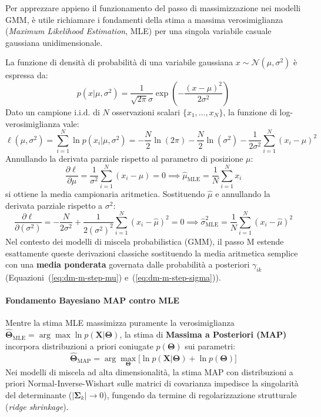 Per apprezzare appieno il funzionamento del passo di massimizzazione nei modelli GMM, è utile richiamare i fondamenti della stima a massima verosimiglianza (\textit{Maximum Likelihood Estimation}, MLE) per una singola variabile casuale gaussiana unidimensionale.

La funzione di densità di probabilità di una variabile gaussiana $x \sim \mathcal{N}(\mu, \sigma^2)$ è espressa da:
\begin{equation}
\label{eq:dm-1d-gaussian-pdf}
p(x | \mu, \sigma^2) = \frac{1}{\sqrt{2\pi}\sigma} \exp\left( -\frac{(x - \mu)^2}{2\sigma^2} \right)
\end{equation}
Dato un campione i.i.d. di $N$ osservazioni scalari $\{x_1, \dots, x_N\}$, la funzione di log-verosimiglianza vale:
\begin{equation}
\label{eq:dm-1d-gaussian-loglik}
\ell(\mu, \sigma^2) = \sum_{i=1}^N \ln p(x_i | \mu, \sigma^2) = -\frac{N}{2} \ln(2\pi) - \frac{N}{2} \ln(\sigma^2) - \frac{1}{2\sigma^2} \sum_{i=1}^N (x_i - \mu)^2
\end{equation}
Annullando la derivata parziale rispetto al parametro di posizione $\mu$:
\begin{equation}
\frac{\partial \ell}{\partial \mu} = \frac{1}{\sigma^2} \sum_{i=1}^N (x_i - \mu) = 0 \implies \hat{\mu}_{\text{MLE}} = \frac{1}{N} \sum_{i=1}^N x_i
\end{equation}
si ottiene la media campionaria aritmetica. Sostituendo $\hat{\mu}$ e annullando la derivata parziale rispetto a $\sigma^2$:
\begin{equation}
\frac{\partial \ell}{\partial (\sigma^2)} = -\frac{N}{2\sigma^2} + \frac{1}{2(\sigma^2)^2} \sum_{i=1}^N (x_i - \hat{\mu})^2 = 0 \implies \hat{\sigma}^2_{\text{MLE}} = \frac{1}{N} \sum_{i=1}^N (x_i - \hat{\mu})^2
\end{equation}
Nel contesto dei modelli di miscela probabilistica (GMM), il passo M estende esattamente queste derivazioni classiche sostituendo la media aritmetica semplice con una \textbf{media ponderata} governata dalle probabilità a posteriori $\gamma_{ik}$ (Equazioni~(\ref{eq:dm-m-step-mu}) e~(\ref{eq:dm-m-step-sigma})).

\paragraph{Fondamento Bayesiano MAP contro MLE}
Mentre la stima MLE massimizza puramente la verosimiglianza $\hat{\boldsymbol{\Theta}}_{\text{MLE}} = \arg\max \ln p(\mathbf{X}|\boldsymbol{\Theta})$, la stima di \textbf{Massima a Posteriori (MAP)} incorpora distribuzioni a priori coniugate $p(\boldsymbol{\Theta})$ sui parametri:
\begin{equation}
\hat{\boldsymbol{\Theta}}_{\text{MAP}} = \arg\max_{\boldsymbol{\Theta}} \big[ \ln p(\mathbf{X}|\boldsymbol{\Theta}) + \ln p(\boldsymbol{\Theta}) \big]
\end{equation}
Nei modelli di miscela ad alta dimensionalità, la stima MAP con distribuzioni a priori Normal-Inverse-Wishart sulle matrici di covarianza impedisce la singolarità del determinante ($|\boldsymbol{\Sigma}_k| \to 0$), fungendo da termine di regolarizzazione strutturale (\textit{ridge shrinkage}).


